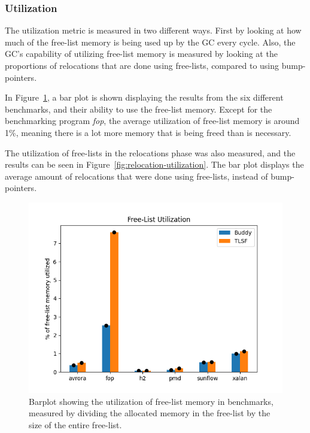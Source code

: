 \subsubsection{Utilization}
The utilization metric is measured in two different ways. First by looking at how much of the free-list memory is being used up by the GC every cycle. Also, the GC's capability of utilizing free-list memory is measured by looking at the proportions of relocations that are done using free-lists, compared to using bump-pointers.

In Figure~\ref{fig:utilization}, a bar plot is shown displaying the results from the six different benchmarks, and their ability to use the free-list memory. Except for the benchmarking program \textit{fop}, the average utilization of free-list memory is around 1\%, meaning there is a lot more memory that is being freed than is necessary.

The utilization of free-lists in the relocations phase was also measured, and the results can be seen in Figure~\ref*{fig:relocation-utilization}. The bar plot displays the average amount of relocations that were done using free-lists, instead of bump-pointers. 

\begin{figure}[H]
  \centering
  \includegraphics[width=1\textwidth]{figures/utilization2.png}
  \caption{Barplot showing the utilization of free-list memory in benchmarks, measured by dividing the allocated memory in the free-list by the size of the entire free-list.}
  \label{fig:utilization}
\end{figure}

